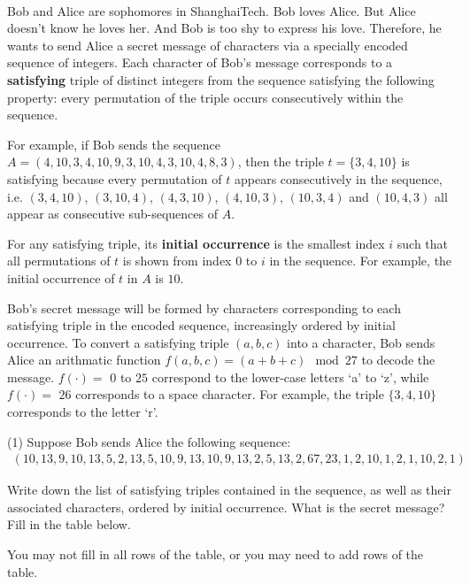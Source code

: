 \documentclass{article}
\begin{document}
\paragraph{}
Bob and Alice are sophomores in ShanghaiTech. Bob loves Alice. But Alice doesn't know he loves her. And Bob is too shy to express his love. Therefore, he wants to send Alice a secret message of characters via a specially encoded sequence of integers. Each character of Bob's message corresponds to a \textbf{satisfying} triple of distinct integers from the sequence satisfying the following property: every permutation of the triple occurs consecutively within the sequence.

For example, if Bob sends the sequence $A=(4,10,3,4,10,9,3,10,4,3,10,4,8,3)$, then the triple $t=\{3,4,10\}$ is satisfying because every permutation of $t$ appears consecutively in the sequence, i.e. $(3,4,10)$, $(3,10,4)$, $(4,3,10)$, $(4,10,3)$, $(10,3,4)$ and $(10,4,3)$ all appear as consecutive sub-sequences of $A$.

For any satisfying triple, its \textbf{initial occurrence} is the smallest index $i$ such that all permutations of $t$ is shown from index $0$ to $i$ in the sequence. For example, the initial occurrence of $t$ in $A$ is $10$.

Bob's secret message will be formed by characters corresponding to each satisfying triple in the encoded sequence, increasingly ordered by initial occurrence. To convert a satisfying triple $(a,b,c)$ into a character, Bob sends Alice an arithmatic function $f(a,b,c)=(a+b+c) \mod 27$ to decode the message. $f(\cdot)=$ $0$ to $25$ correspond to the lower-case letters `a' to `z', while $f(\cdot)=$ $26$ corresponds to a space character. For example, the triple $\{3,4,10\}$ corresponds to the letter `r'.

(1) Suppose Bob sends Alice the following sequence:
\begin{align*}
(10,13,9,10,13,5,2,13,5,10,9,13,10,9,13,2,5,13,2,67,23,1,2,10,1,2,1,10,2,1)
\end{align*} 

Write down the list of satisfying triples contained in the sequence, as well as their associated characters, ordered by initial occurrence. What is the secret message? Fill in the table below. 

You may not fill in all rows of the table, or you may need to add rows of the table.
\end{document}
